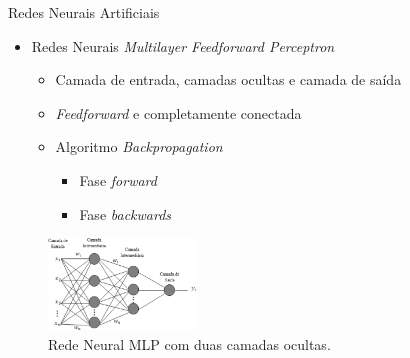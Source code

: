 \begin{frame}{Redes Neurais Artificiais}
   \ \  \\[0.1cm]
   \begin{itemize}
        \item Redes Neurais \alert{\emph{Multilayer Feedforward Perceptron}}
        \begin{itemize}
          \item Camada de entrada, camadas ocultas e camada de saída
          \item \emph{Feedforward} e completamente conectada
          \item Algoritmo \emph{Backpropagation}
          \begin{itemize}
               \item Fase \emph{forward}
               \item Fase \emph{backwards}
          \end{itemize}
\end{itemize}
   \end{itemize}
   \begin{figure}[ht]
    \centering
    \label{fig:mlp}
    \includegraphics[width=0.35\textwidth]{img/mlprna.jpg}
     \caption{Rede Neural MLP com duas camadas ocultas.}
   \end{figure}

\end{frame}

